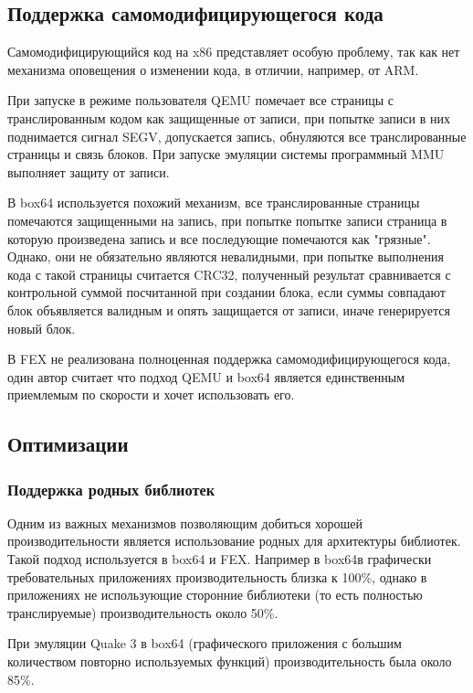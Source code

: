 \subsection{Поддержка самомодифицирующегося кода}

Самомодифицирующийся код на x86 представляет особую проблему, так как нет механизма оповещения о изменении кода, в отличии, например, от ARM.

При запуске в режиме пользователя QEMU помечает все страницы с транслированным кодом как защищенные от записи, при попытке записи в них поднимается сигнал SEGV, допускается запись, обнуляются все транслированные страницы и связь блоков. При запуске эмуляции системы программный MMU выполняет защиту от записи. \cite{qemu_docs}

В box64 используется похожий механизм, все транслированные страницы помечаются защищенными на запись, при попытке попытке записи страница в которую произведена запись и все последующие помечаются как "грязные". Однако, они не обязательно являются невалидными, при попытке выполнения кода с такой страницы считается CRC32, полученный результат сравнивается с контрольной суммой посчитанной при создании блока, если суммы совпадают блок объявляется валидным и опять защищается от записи, иначе генерируется новый блок. \cite{box64_letter}

В FEX не реализована полноценная поддержка самомодифицирующегося кода, один автор считает что подход QEMU и box64 является единственным приемлемым по скорости и хочет использовать его. \cite{FEX_letter}

\subsection{Оптимизации}

\subsubsection{Поддержка родных библиотек}

Одним из важных механизмов позволяющим добиться хорошей производительности является использование родных для архитектуры библиотек. Такой подход используется в box64 и FEX. Например в box64в графически требовательных приложениях производительность близка к 100\%, однако в приложениях не использующие сторонние библиотеки (то есть полностью транслируемые) производительность около 50\%.

При эмуляции Quake 3 в box64 (графического приложения с большим количеством повторно используемых функций) производительность была около 85\%.

